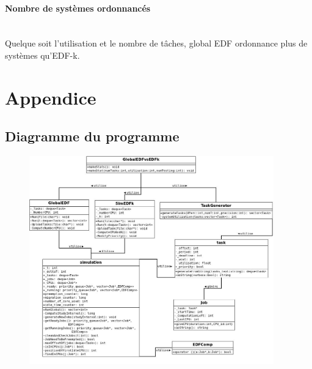 \documentclass[a4paper,10pt]{article}
\begin{document}
	\paragraph*{Nombre de systèmes ordonnancés}~\\
		Quelque soit l'utilisation et le nombre de tâches, global EDF ordonnance plus de systèmes qu'EDF-k.


\pagebreak
\section{Appendice}
	
	
	  	
	 \subsection{Diagramme du programme}
		\begin{figure}[H] \hspace*{-2cm} 
    	\centering
   		  \includegraphics[width=300pt]{DiagUML.jpeg} 
	  	\end{figure}
	  
\end{document}
